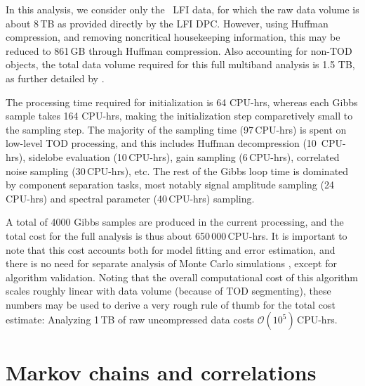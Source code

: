 \documentclass[twocolumn]{aa}
\begin{document}
In this analysis, we consider only the \Planck\ LFI data, for which
the raw data volume is about 8\,TB as provided directly by the LFI
DPC. However, using Huffman compression, and removing noncritical
housekeeping information, this may be reduced to 861\,GB through
Huffman compression. Also accounting for non-TOD objects, the total
data volume required for this full multiband analysis is 1.5 TB, as
further detailed by \citet{bp03}.

The processing time required for initialization is 64 CPU-hrs, whereas
each Gibbs sample takes 164 CPU-hrs, making the initialization step
comparetively small to the sampling step. The majority of the sampling time
(97\,CPU-hrs) is spent on low-level TOD processing, and this includes
Huffman decompression (10\, CPU-hrs), sidelobe evaluation
(10\,CPU-hrs), gain sampling (6\,CPU-hrs), correlated noise sampling
(30\,CPU-hrs), etc. The rest of the Gibbs loop time is dominated
by component separation tasks, most notably signal amplitude sampling
(24\,CPU-hrs) and spectral parameter (40\,CPU-hrs) sampling.

A total of 4000 Gibbs samples are produced in the current processing,
and the total cost for the full analysis is thus about
650\,000\,CPU-hrs. It is important to note that this cost accounts
both for model fitting and error estimation, and there is no need for
separate analysis of Monte Carlo simulations \citep{bp04}, except for
algorithm validation. Noting that the overall computational cost of
this algorithm scales roughly linear with data volume (because of TOD
segmenting), these numbers may be used to derive a very rough
rule of thumb for the total cost estimate: Analyzing 1\,TB of raw
uncompressed data costs $\mathcal{O}(10^5)$\,CPU-hrs.










\section{Markov chains and correlations}
\label{sec:markov_chains}
\end{document}
